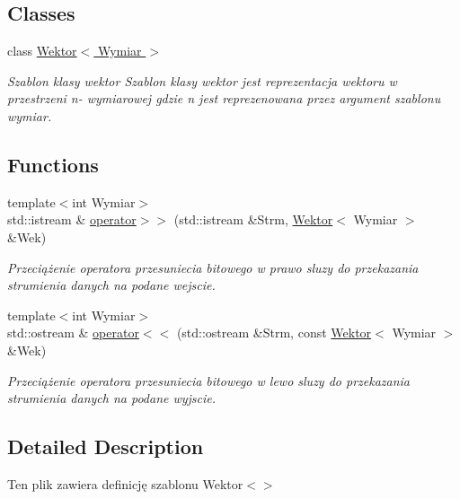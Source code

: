 \subsection*{Classes}
\begin{DoxyCompactItemize}
\item 
class \hyperlink{classWektor}{Wektor$<$ Wymiar $>$}
\begin{DoxyCompactList}\small\item\em Szablon klasy wektor Szablon klasy wektor jest reprezentacja wektoru w przestrzeni n-\/ wymiarowej gdzie n jest reprezenowana przez argument szablonu wymiar. \end{DoxyCompactList}\end{DoxyCompactItemize}
\subsection*{Functions}
\begin{DoxyCompactItemize}
\item 
{\footnotesize template$<$int Wymiar$>$ }\\std\+::istream \& \hyperlink{Wektor_8hh_a936d42e42728823fb375e5e2122c2fe0}{operator$>$$>$} (std\+::istream \&Strm, \hyperlink{classWektor}{Wektor}$<$ Wymiar $>$ \&Wek)
\begin{DoxyCompactList}\small\item\em Przeciążenie operatora przesuniecia bitowego w prawo sluzy do przekazania strumienia danych na podane wejscie. \end{DoxyCompactList}\item 
{\footnotesize template$<$int Wymiar$>$ }\\std\+::ostream \& \hyperlink{Wektor_8hh_a15a4e77c646218f10d5e34a3fd4a877a}{operator$<$$<$} (std\+::ostream \&Strm, const \hyperlink{classWektor}{Wektor}$<$ Wymiar $>$ \&Wek)
\begin{DoxyCompactList}\small\item\em Przeciążenie operatora przesuniecia bitowego w lewo sluzy do przekazania strumienia danych na podane wyjscie. \end{DoxyCompactList}\end{DoxyCompactItemize}


\subsection{Detailed Description}
Ten plik zawiera definicję szablonu Wektor$<$$>$ 



